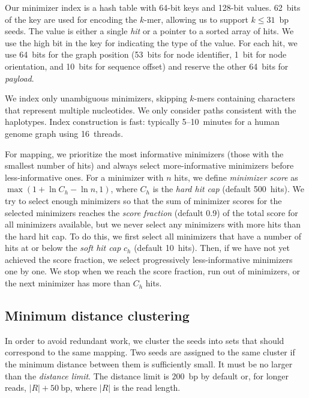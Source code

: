 \documentclass[11pt]{ucscthesis}
\newcommand{\param}[1]{\emph{#1}}
\newcommand{\vocab}[1]{\emph{#1}}
\begin{document}
Our minimizer index is a hash table with 64-bit keys and 128-bit values.
62~bits of the key are used for encoding the $k$-mer, allowing us to support $k \le 31$~bp seeds.
The value is either a single \vocab{hit} or a pointer to a sorted array of hits.
We use the high bit in the key for indicating the type of the value.
For each hit, we use 64~bits for the graph position (53~bits for node identifier, 1~bit for node orientation, and 10~bits for sequence offset) and reserve the other 64~bits for \vocab{payload}.

We index only unambiguous minimizers, skipping $k$-mers containing characters that represent multiple nucleotides.
We only consider paths consistent with the haplotypes.
Index construction is fast: typically 5--10~minutes for a human genome graph using 16~threads.

For mapping, we prioritize the most informative minimizers (those with the smallest number of hits) and always select more-informative minimizers before less-informative ones.
For a minimizer with $n$ hits, we define \vocab{minimizer score} as $\max\left(1 + \ln C_h - \ln n, 1\right)$, where $C_h$ is the \param{hard hit cap} (default 500~hits).
We try to select enough minimizers so that the sum of minimizer scores for the selected minimizers reaches the \param{score fraction} (default 0.9) of the total score for all minimizers available, but we never select any minimizers with more hits than the hard hit cap.
To do this, we first select all minimizers that have a number of hits at or below the \param{soft hit cap} $c_h$ (default 10~hits).
Then, if we have not yet achieved the score fraction, we select progressively less-informative minimizers one by one. We stop when we reach the score fraction, run out of minimizers, or the next minimizer has more than $C_h$ hits.

\subsection{Minimum distance clustering}
\label{subsec:aim2:clustering}
In order to avoid redundant work, we cluster the seeds into sets that should correspond to the same mapping.
Two seeds are assigned to the same cluster if the minimum distance between them is sufficiently small. It must be no larger than the \param{distance limit}. The distance limit is $200$~bp by default or, for longer reads, $|R| + 50~\mathrm{bp}$, where $|R|$ is the read length.
\end{document}
